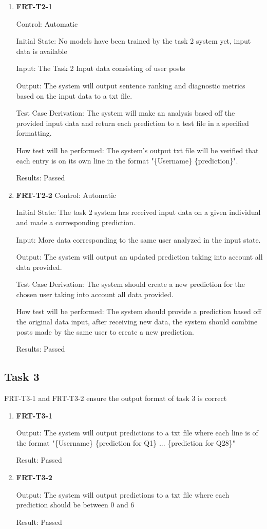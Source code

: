 \documentclass[12pt, titlepage]{article}
\begin{document}
 \begin{enumerate}
 
 \item \textbf{FRT-T2-1}

Control: Automatic

Initial State: No models have been trained by the task 2 system yet, input data is available

Input: The Task 2 Input data consisting of user posts

Output: The system will output sentence ranking and diagnostic metrics based on the input data to a txt file.

Test Case Derivation: The system will make an analysis based off the provided input data and return each prediction to a test file in a specified formatting.

How test will be performed: The system's output txt file will be verified that each entry is on its own line in the format "\{Username\} \{prediction\}".

Results: Passed

 \item \textbf{FRT-T2-2}
 Control: Automatic

Initial State: The task 2 system has received input data on a given individual and made a corresponding prediction.

Input: More data corresponding to the same user analyzed in the input state.

Output: The system will output an updated prediction taking into account all data provided.

Test Case Derivation: The system should create a new prediction for the chosen user taking into account all data provided.

How test will be performed: The system should provide a prediction based off the original data input, after receiving new data, the system should combine posts made by the same user to create a new prediction. 

Results: Passed
 \end{enumerate}

 \subsection{Task 3}

FRT-T3-1 and FRT-T3-2 ensure the output format of task 3 is correct
 
 \begin{enumerate}
 
 \item \textbf{FRT-T3-1}

Output: The system will output predictions to a txt file where each line is of the format "\{Username\} \{prediction for Q1\} ... \{prediction for Q28\}"

Result: Passed

\item \textbf{FRT-T3-2}

Output: The system will output predictions to a txt file where each prediction should be between 0 and 6

Result: Passed

\end{enumerate}
\end{document}
